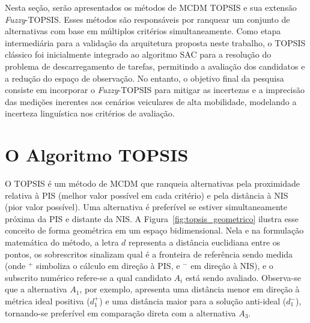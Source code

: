 Nesta seção, serão apresentados os métodos de \gls{MCDM} \gls{TOPSIS} e sua extensão \textit{\textit{Fuzzy}}-\gls{TOPSIS}. Esses métodos são responsáveis por ranquear um conjunto de alternativas com base em múltiplos critérios simultaneamente. Como etapa intermediária para a validação da arquitetura proposta neste trabalho, o \gls{TOPSIS} clássico foi inicialmente integrado ao algoritmo \gls{SAC} para a resolução do problema de descarregamento de tarefas, permitindo a avaliação dos candidatos e a redução do espaço de observação. No entanto, o objetivo final da pesquisa consiste em incorporar o \textit{\textit{Fuzzy}}-\gls{TOPSIS} para mitigar as incertezas e a imprecisão das medições inerentes aos cenários veiculares de alta mobilidade, modelando a incerteza linguística nos critérios de avaliação.

\section*{O Algoritmo TOPSIS}
\label{subsec:topsis-algoritmo}

O \gls{TOPSIS} é um método de \gls{MCDM} que ranqueia alternativas pela proximidade relativa à \gls{PIS} (melhor valor possível em cada critério) e pela distância à \gls{NIS} (pior valor possível). Uma alternativa é preferível se estiver simultaneamente próxima da \gls{PIS} e distante da \gls{NIS}. A Figura~\ref{fig:topsis_geometrico} ilustra esse conceito de forma geométrica em um espaço bidimensional. Nela e na formulação matemática do método, a letra $d$ representa a distância euclidiana entre os pontos, os sobrescritos sinalizam qual é a fronteira de referência sendo medida (onde $^+$ simboliza o cálculo em direção à PIS, e $^-$ em direção à NIS), e o subscrito numérico refere-se a qual candidato $A_i$ está sendo avaliado. Observa-se que a alternativa $A_1$, por exemplo, apresenta uma distância menor em direção à métrica ideal positiva ($d^+_1$) e uma distância maior para a solução anti-ideal ($d^-_1$), tornando-se preferível em comparação direta com a alternativa $A_3$.


